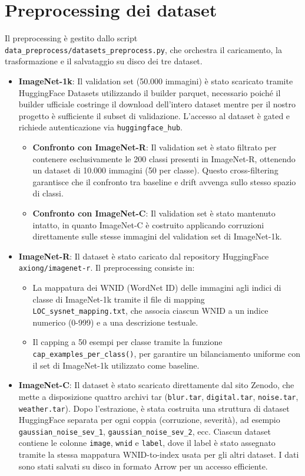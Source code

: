 \section{Preprocessing dei dataset}
Il preprocessing è gestito dallo script \texttt{data\_preprocess/datasets\_preprocess.py}, che orchestra il caricamento, la trasformazione e il salvataggio su disco dei tre dataset.
\begin{itemize}
	\item \textbf{ImageNet-1k}: Il validation set (50.000 immagini) è stato scaricato tramite HuggingFace Datasets utilizzando il builder parquet, necessario poiché il builder ufficiale costringe il download dell'intero dataset mentre per il nostro progetto è sufficiente il subset di validazione. L'accesso al dataset è gated e richiede autenticazione via \texttt{huggingface\_hub}.
	\begin{itemize}
		\item \textbf{Confronto con ImageNet-R}: Il validation set è stato filtrato per contenere esclusivamente le 200 classi presenti in ImageNet-R, ottenendo un dataset di 10.000 immagini (50 per classe). Questo cross-filtering garantisce che il confronto tra baseline e drift avvenga sullo stesso spazio di classi.
		\item \textbf{Confronto con ImageNet-C}: Il validation set è stato mantenuto intatto, in quanto ImageNet-C è costruito applicando corruzioni direttamente sulle stesse immagini del validation set di ImageNet-1k.
	\end{itemize}
	\item \textbf{ImageNet-R}: Il dataset è stato caricato dal repository HuggingFace \texttt{axiong/imagenet-r}. Il preprocessing consiste in: 
	\begin{itemize}
		\item La mappatura dei WNID (WordNet ID) delle immagini agli indici di classe di ImageNet-1k tramite il file di mapping \texttt{LOC\_sysnet\_mapping.txt}, che associa ciascun WNID a un indice numerico (0-999) e a una descrizione testuale.
		\item Il capping a 50 esempi per classe tramite la funzione \texttt{cap\_examples\_per\_class()}, per garantire un bilanciamento uniforme con il set di ImageNet-1k utilizzato come baseline.
		\end{itemize}
	\item \textbf{ImageNet-C}: Il dataset è stato scaricato direttamente dal sito Zenodo, che mette a disposizione quattro archivi tar (\texttt{blur.tar}, \texttt{digital.tar}, \texttt{noise.tar}, \texttt{weather.tar}). Dopo l'estrazione, è stata costruita una struttura di dataset HuggingFace separata per ogni coppia (corruzione, severità), ad esempio \texttt{gaussian\_noise\_sev\_1}, \texttt{gaussian\_noise\_sev\_2}, ecc. Ciascun dataset contiene le colonne \texttt{image}, \texttt{wnid} e \texttt{label}, dove il label è stato assegnato tramite la stessa mappatura WNID-to-index usata per gli altri dataset. I dati sono stati salvati su disco in formato Arrow per un accesso efficiente.

	\end{itemize}

